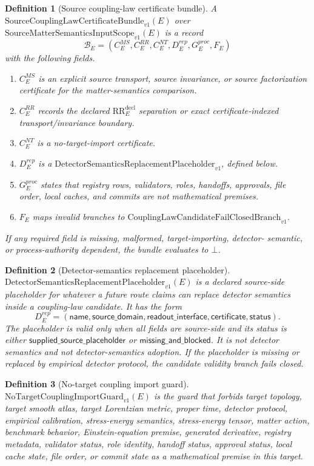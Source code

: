\documentclass[11pt]{article}
\newcommand{\RREObj}{\mathrm{RR}_{E}^{\mathrm{decl}}}
\newcommand{\SCLBundle}{\mathrm{SourceCouplingLawCertificateBundle}_{v1}}
\newcommand{\SMScope}{\mathrm{SourceMatterSemanticsInputScope}_{v1}}
\newcommand{\DetPlaceholder}{\mathrm{DetectorSemanticsReplacementPlaceholder}_{v1}}
\newcommand{\NTGuard}{\mathrm{NoTargetCouplingImportGuard}_{v1}}
\newcommand{\FailBranch}{\mathrm{CouplingLawCandidateFailClosedBranch}_{v1}}
\newcommand{\Bottom}{\bot}
\newtheorem{definition}{Definition}
\begin{document}
\begin{definition}[Source coupling-law certificate bundle]
A \(\SCLBundle(E)\) over \(\SMScope(E)\) is a record
\[
  \mathcal B_E =
  (C^{MS}_E,C^{RR}_E,C^{NT}_E,D^{rep}_E,G^{proc}_E,F_E)
\]
with the following fields.
\begin{enumerate}[label=\textup{(\alph*)},leftmargin=2em]
  \item \(C^{MS}_E\) is an explicit source transport, source invariance, or
  source factorization certificate for the matter-semantics comparison.
  \item \(C^{RR}_E\) records the declared \(\RREObj\) separation or exact
  certificate-indexed transport/invariance boundary.
  \item \(C^{NT}_E\) is a no-target-import certificate.
  \item \(D^{rep}_E\) is a \(\DetPlaceholder\), defined below.
  \item \(G^{proc}_E\) states that registry rows, validators, roles, handoffs,
  approvals, file order, local caches, and commits are not mathematical
  premises.
  \item \(F_E\) maps invalid branches to \(\FailBranch\).
\end{enumerate}
If any required field is missing, malformed, target-importing, detector-
semantic, or process-authority dependent, the bundle evaluates to \(\Bottom\).
\end{definition}

\begin{definition}[Detector-semantics replacement placeholder]
\(\DetPlaceholder(E)\) is a declared source-side placeholder for whatever a
future route claims can replace detector semantics inside a coupling-law
candidate. It has the form
\[
  D^{rep}_E=(\mathsf{name},\mathsf{source\_domain},
  \mathsf{readout\_interface},\mathsf{certificate},\mathsf{status}).
\]
The placeholder is valid only when all fields are source-side and its status
is either \(\mathsf{supplied\_source\_placeholder}\) or
\(\mathsf{missing\_and\_blocked}\). It is not detector semantics and not
detector-semantics adoption. If the placeholder is missing or replaced by
empirical detector protocol, the candidate validity branch fails closed.
\end{definition}

\begin{definition}[No-target coupling import guard]
\(\NTGuard(E)\) is the guard that forbids target topology, target smooth
atlas, target Lorentzian metric, proper time, detector protocol, empirical
calibration, stress-energy semantics, stress-energy tensor, matter action,
benchmark behavior, Einstein-equation premise, generated derivative,
registry metadata, validator status, role identity, handoff status, approval
status, local cache state, file order, or commit state as a mathematical
premise in this target.
\end{definition}
\end{document}
